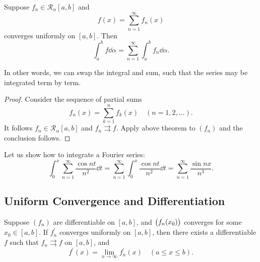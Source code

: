 \begin{corollary}
Suppose $f_n\in \mathcal{R}_\alpha[a,b]$ and
\[f(x)=\sum_{n=1}^\infty f_n(x)\]
converges uniformly on $[a,b]$. Then
\[\int_a^b f\dd{\alpha}=\sum_{n=1}^{\infty}\int_{a}^{b}f_n\dd{\alpha}. \]
\end{corollary}

In other words, we can swap the integral and sum, such that the series may be integrated term by term.

\begin{proof}
Consider the sequence of partial sums 
\[f_n(x)=\sum_{k=1}^n f_k(x)\quad(n=1,2,\dots).\]
It follows $f_n\in \mathcal{R}_\alpha[a,b]$ and $f_n\rightrightarrows f$. Apply above theorem to $(f_n)$ and the conclusion follows.
\end{proof}

\begin{example}
Let us show how to integrate a Fourier series:
\[\int_{0}^{x}\sum_{n=1}^{\infty}\frac{\cos nt}{n^2}\dd{t}=\sum_{n=1}^{\infty}\int_{0}^{x}\frac{\cos nt}{n^2}\dd{t}=\sum_{n=1}^{\infty}\frac{\sin nx}{n^3}.\]
\end{example}
\pagebreak

\subsection{Uniform Convergence and Differentiation}
\begin{proposition}
Suppose $(f_n)$ are differentiable on $[a,b]$, and $\left(f_n(x_0)\right)$ converges for some $x_0\in[a,b]$. If $f_n^\prime$ converges uniformly on $[a,b]$, then there exists a differentiable $f$ such that $f_n\rightrightarrows f$ on $[a,b]$, and
\[f^\prime(x)=\lim_{n\to\infty}f_n^\prime(x)\quad(a\le x\le b).\]
\end{proposition}

